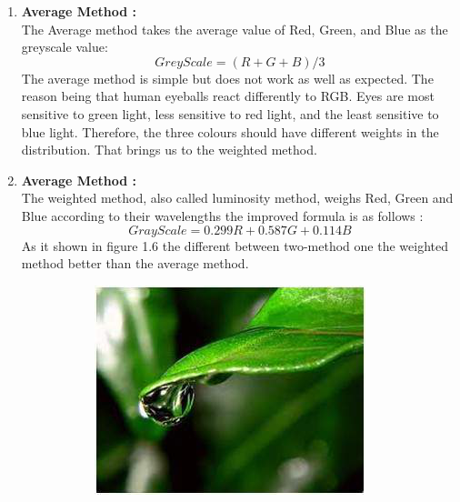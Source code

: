         \begin{enumerate}
                \item \textbf{Average Method :} \\
                The Average method takes the average value of Red, Green, and Blue as the greyscale value:
                \begin{equation}
                        GreyScale = (R + G + B) /3\label{eq:equation}
                \end{equation}
                The average method is simple but does not work as well as expected.
                The reason being that human eyeballs react differently to RGB.
                Eyes are most sensitive to green light, less sensitive to red light,
                and the least sensitive to blue light. Therefore, the three colours should have
                different weights in the distribution. That brings us to the weighted method.
                \item \textbf{Average Method :} \\
                The weighted method, also called luminosity method, weighs Red,
                Green and Blue according to their wavelengths the improved formula is as follows :
                \begin{equation}
                        GrayScale = 0.299R + 0.587G + 0.114B\label{eq:equation2}
                \end{equation}
                As it shown in figure 1.6 the different between two-method one the weighted method better than the average method.
                \begin{figure}[h]
                        \centering
                        \begin{subfigure}[b]{0.3\textwidth}
                                \centering
                                \includegraphics[width=\textwidth]{chapiter1/figures/original-grey.png}

\end{subfigure}
\end{figure}
\end{enumerate}
